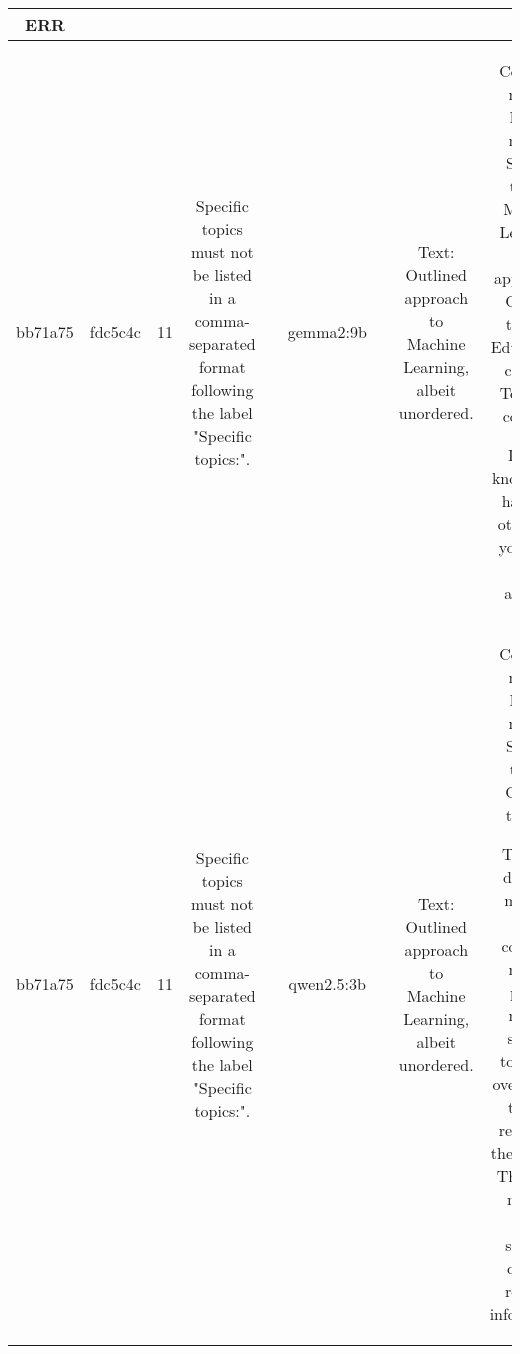 \begin{table}[h!]
\begin{tabular}{|c|c|c|c|c|c|c|c|c|c|c|}
ERR\\
\hline
bb71a75 & fdc5c4c & 11 & Specific topics must not be listed in a comma-separated format following the label "Specific topics:". &  & gemma2:9b &  & Text: Outlined approach to Machine Learning, albeit unordered. & Company names: 
People names: 
Specific topics: Machine Learning, ML approaches
General themes:  Educational content, Technical concepts 


Let me know if you have any other text you'd like me to analyze! 
 & err & The chatbot's output does not comply with the description. According to the desired format outlined in the description, each category should have a comma-separated list of entities. In the given output, "Company names" and "People names" are left blank and not represented as a comma-separated list. Additionally, the description requests the format, "Desired format: Company names: <comma_separated_list_of_company_names>", which implies that these lists should be explicitly stated, even if they are empty. Furthermore, the additional text, "Let me know if you have any other text you'd like me to analyze!", is not part of the expected output format and deviates from the description. Therefore, the output violates the chatbot's description.

ERR\\
\hline
bb71a75 & fdc5c4c & 11 & Specific topics must not be listed in a comma-separated format following the label "Specific topics:". &  & qwen2.5:3b &  & Text: Outlined approach to Machine Learning, albeit unordered. & Company names: 
People names: 
Specific topics: 
General themes: 

The text does not mention any company names, people names, specific topics, or overarching themes related to the content. Therefore, none of these sections contain relevant information. & ok & The output format matches the desired format specified in the description, consisting of sections for company names, people names, specific topics, and general themes. Each section is followed by a colon as specified. It also provides an explanation for the absence of any entities in each of these categories. Since there is no way to evaluate the correctness of the extracted elements without knowing the input text, I cannot assess if the explanation provided here is justified or not. Therefore, I can only verify that the format adheres to the instructions in the description. The compliance check only concerns the adherence to the specified structure, and the output is consistent with that structure.


\end{tabular}
\end{table}
